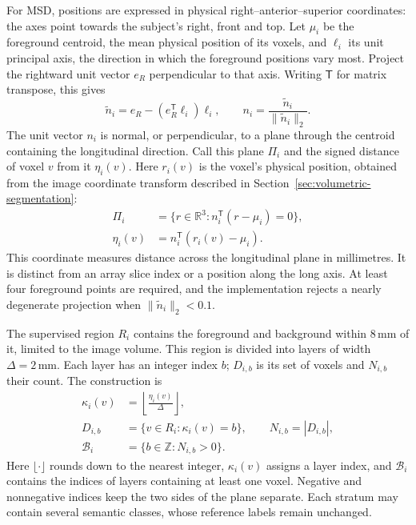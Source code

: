 \documentclass[12pt,a4paper]{article}
\begin{document}
For MSD, positions are expressed in physical right--anterior--superior
coordinates: the axes point towards the subject's right, front and top.
Let $\mu_i$ be the foreground centroid, the mean physical position of its
voxels, and $\ell_i$ its unit principal axis, the direction in which the
foreground positions vary most.
Project the rightward unit vector $e_R$ perpendicular to that axis.
Writing $\mathsf T$ for matrix transpose, this gives
\begin{equation}
\widetilde n_i=e_R-(e_R^{\mathsf T}\ell_i)\ell_i,
\qquad
n_i=\frac{\widetilde n_i}{\|\widetilde n_i\|_2}.
\label{eq:depth-plane-normal}
\end{equation}
The unit vector $n_i$ is normal, or perpendicular, to a plane through
the centroid containing the longitudinal direction. Call this plane
$\Pi_i$ and the signed distance of voxel $v$ from it $\eta_i(v)$.
Here $r_i(v)$ is the voxel's physical position, obtained from the image
coordinate transform described in Section~\ref{sec:volumetric-segmentation}:
\begin{equation}
\begin{aligned}
\Pi_i&=\{r\in\mathbb{R}^{3}:n_i^{\mathsf T}(r-\mu_i)=0\},\\
\eta_i(v)&=n_i^{\mathsf T}(r_i(v)-\mu_i).
\end{aligned}
\label{eq:depth-plane-coordinate}
\end{equation}
This coordinate measures distance across the longitudinal plane in
millimetres. It is distinct from an array slice index or a position
along the long axis. At least four foreground points are required,
and the implementation rejects a nearly degenerate projection when
$\|\widetilde n_i\|_2<0.1$.

The supervised region $R_i$ contains the foreground and background
within $8\,\mathrm{mm}$ of it, limited to the image volume. This region
is divided into layers of width $\Delta=2\,\mathrm{mm}$. Each layer
has an integer index $b$; $D_{i,b}$ is its set of voxels and $N_{i,b}$
their count. The construction is
\begin{equation}
\begin{aligned}
\kappa_i(v)&=\left\lfloor\frac{\eta_i(v)}{\Delta}\right\rfloor,\\
D_{i,b}&=\{v\in R_i:\kappa_i(v)=b\},
\qquad N_{i,b}=|D_{i,b}|,\\
\mathcal{B}_i&=\{b\in\mathbb{Z}:N_{i,b}>0\}.
\end{aligned}
\label{eq:depth-strata}
\end{equation}
Here $\lfloor\cdot\rfloor$ rounds down to the nearest integer,
$\kappa_i(v)$ assigns a layer index, and $\mathcal B_i$ contains the
indices of layers containing at least one voxel. Negative and nonnegative
indices keep the two sides of the plane separate.
Each stratum may contain several semantic classes, whose reference
labels remain unchanged.
\end{document}
